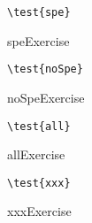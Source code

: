 \documentclass{article}
\newcommand{\test}[1]{
		\expandafter\textbf\csname #1Exercise\endcsname
	}
\begin{document}
\verb+\test{spe}+

\test{spe}


\medskip

\verb+\test{noSpe}+

\test{noSpe}


\medskip

\verb+\test{all}+

\test{all}


\medskip

\verb+\test{xxx}+

\test{xxx}
\end{document}

